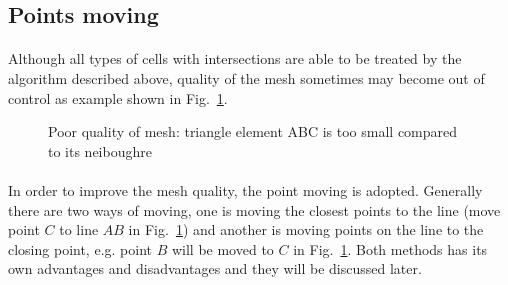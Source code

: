 \pagebreak
\subsection{Points moving}
\label{qdt_sc:point_moving}
\paragraph{}
Although all types of cells with intersections are able to be treated by the algorithm described above, quality of the mesh sometimes may become out of control as example shown in Fig.~\ref{qdt_fig:qdt_cutting_poor_mesh_quality}.
    \begin{figure}[h!]
        \centering
        \caption[Poor quality of mesh]{Poor quality of mesh: triangle element ABC is too small compared to its neiboughre}
        \label{qdt_fig:qdt_cutting_poor_mesh_quality}
    \end{figure}
\paragraph{}
In order to improve the mesh quality, the point moving is adopted.
Generally there are two ways of moving, one is moving the closest points to the line (move point $C$ to line $AB$ in Fig.~\ref{qdt_fig:qdt_cutting_poor_mesh_quality}) and another is moving points on the line to the closing point, e.g. point $B$ will be moved to $C$ in Fig.~\ref{qdt_fig:qdt_cutting_poor_mesh_quality}.
Both methods has its own advantages and disadvantages and they will be discussed later.

